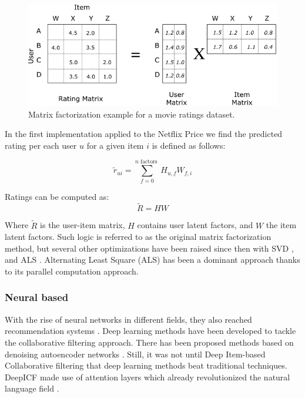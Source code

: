 \documentclass{kththesis}
\begin{document}
\begin{figure}[H]
    \centering
    \includegraphics[width=\textwidth]{matrix_factorization.png}
    \caption{Matrix factorization example for a movie ratings dataset.}
\end{figure}

In the first implementation applied to the Netflix Price \cite{matrixvanilla} we find the predicted rating per each user $u$ for a given item $i$ is defined as follows:

\begin{equation}
    \tilde{r}_{u i}=\sum_{f=0}^{n \text { factors }} H_{u, f} W_{f, i}
\end{equation}

Ratings can be computed as:
\begin{equation}
    \tilde{R}=H W
\end{equation}

Where $\tilde{R}$ is the user-item matrix, $H$ contains user latent factors, and $W$ the item latent factors. Such logic is referred to as the original matrix factorization method, but several other optimizations have been raised since then with SVD \cite{svd}, and ALS \cite{alsnetflix}. Alternating Least Square (ALS) has been a dominant approach thanks to its parallel computation approach.


\subsubsection{Neural based}
With the rise of neural networks in different fields, they also reached recommendation systems \cite{neuralonrecommendations}. Deep learning methods have been developed to tackle the collaborative filtering approach. There has been proposed methods based on denoising autoencoder networks \cite{wang2015collaborative}. Still, it was not until Deep Item-based Collaborative filtering \cite{deepicf} that deep learning methods beat traditional techniques. DeepICF made use of attention layers which already revolutionized the natural language field \cite{attention}. 
\end{document}
